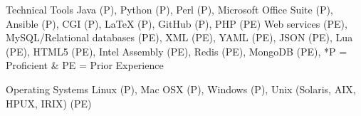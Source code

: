 


\begin{cvskills}


\cvskill
{Technical Tools} %
{Java (P), Python (P), Perl (P), Microsoft Office Suite (P), Ansible (P), CGI (P), LaTeX (P), GitHub (P), PHP (PE) Web services (PE), MySQL/Relational databases (PE), XML (PE), YAML (PE), JSON (PE), Lua (PE),  HTML5 (PE), Intel Assembly (PE),  Redis (PE), MongoDB (PE), *P = Proficient \& PE = Prior Experience} %





\cvskill
{Operating Systems} %
{Linux (P), Mac OSX (P), Windows (P), Unix (Solaris, AIX, HPUX, IRIX) (PE)} %




\end{cvskills}